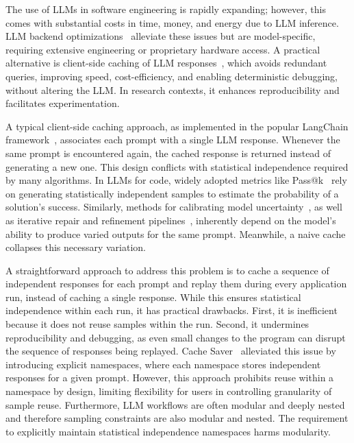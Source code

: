 \documentclass[sigconf]{acmart}
\begin{document}
The use of LLMs in software engineering is rapidly expanding; however, this comes with substantial costs in time, money, and energy due to LLM inference. LLM backend optimizations~\cite{kwon2023vllm} alleviate these issues but are model-specific, requiring extensive engineering or proprietary hardware access. A practical alternative is client-side caching of LLM responses~\cite{bang-2023-gptcache, meancache2024, potamitiscache}, which avoids redundant queries, improving speed, cost-efficiency, and enabling deterministic debugging, without altering the LLM. In research contexts, it enhances reproducibility and facilitates experimentation.

A typical client-side caching approach, as implemented in the popular LangChain framework~\cite{langchain2023}, associates each prompt with a single LLM response. Whenever the same prompt is encountered again, the cached response is returned instead of generating a new one. This design conflicts with statistical independence required by many algorithms. In LLMs for code, widely adopted metrics like Pass@k~\cite{chen2021evaluatinglargelanguagemodels} rely on generating statistically independent samples to estimate the probability of a solution's success. Similarly, methods for calibrating model uncertainty~\cite{hobelsberger2025systematicevaluationuncertaintyestimation, lyu2025calibrating, manakul2023selfcheckgptzeroresourceblackboxhallucination}, as well as iterative repair and refinement pipelines~\cite{jia2025automatedrepairambiguousproblem, madaan2023selfrefineiterativerefinementselffeedback, shinn2023reflexionlanguageagentsverbal}, inherently depend on the model's ability to produce varied outputs for the same prompt. Meanwhile, a naive cache collapses this necessary variation.

A straightforward approach to address this problem is to cache a sequence of independent responses for each prompt and replay them during every application run, instead of caching a single response. While this ensures statistical independence within each run, it has practical drawbacks. First, it is inefficient because it does not reuse samples within the run. Second, it undermines reproducibility and debugging, as even small changes to the program can disrupt the sequence of responses being replayed. Cache Saver~\cite{potamitiscache} alleviated this issue by introducing explicit namespaces, where each namespace stores independent responses for a given prompt. However, this approach prohibits reuse within a namespace by design, limiting flexibility for users in controlling granularity of sample reuse. Furthermore, LLM workflows are often modular and deeply nested and therefore sampling constraints are also modular and nested. The requirement to explicitly maintain statistical independence namespaces harms modularity.
\end{document}
